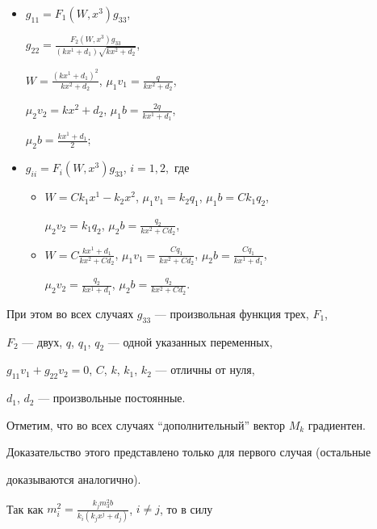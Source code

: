 \begin{thm}
\begin{itemize}
\item[2)] $g_{11}=F_1(W,x^3)g_{33}$, 


$g_{22}=\frac{F_2(W,x^3)g_{33}}{(kx^1+d_1)\sqrt{kx^2+d_2}}$, 


$W=\frac{(kx^1+d_1)^2}{kx^2+d_2}$, $\mu_1v_1=\frac{q}{kx^2+d_2}$, 


$\mu_2v_2=kx^2+d_2$, $\mu_1b=\frac{2q}{kx^1+d_1}$, 


$\mu_2b=\frac{kx^1+d_1}{2};$ 


\item[3)] $g_{ii}=F_i(W,x^3)g_{33}$, $i=1,2,$ где 


\begin{itemize} 


\item[а)] $W=C k_1x^1-k_2x^2$, $\mu_1v_1=k_2q_1$, $\mu_1b=C k_1q_2$, 


$\mu_2v_2=k_1q_2$, $\mu_2b=\frac{q_2}{kx^2+C d_2}$, 


\item[б)] $W=C\frac{kx^1+d_1}{kx^2+C d_2}$, $\mu_1v_1=\frac{C 


q_1}{kx^2+C d_2}$, $\mu_2b=\frac{C q_1}{kx^1+d_1}$, 


$\mu_2v_2=\frac{q_2}{kx^1+d_1}$, $\mu_2b=\frac{q_2}{kx^2+C d_2}$. 


\end{itemize} 


\end{itemize} 


При этом во всех случаях $g_{33}$ --- произвольная функция трех, $F_1$, 


$F_2$ --- двух, $q$, $q_1$, $q_2$ --- одной указанных переменных, 


$g_{11}v_1+g_{22}v_2=0$, $C$, $k$, $k_1$, $k_2$ --- отличны от нуля, 


$d_1$, $d_2$ --- произвольные постоянные. 


\end{thm} 


 


Отметим, что во всех случаях ``дополнительный'' вектор $M_k$ градиентен. 


Доказательство этого представлено только для первого случая (остальные 


доказываются аналогично). 


 


Так как $m^2_i=\frac{k_j m^2_3b}{k_i(k_j x^j+d_j)}$, $i\ne j$, то в силу 



